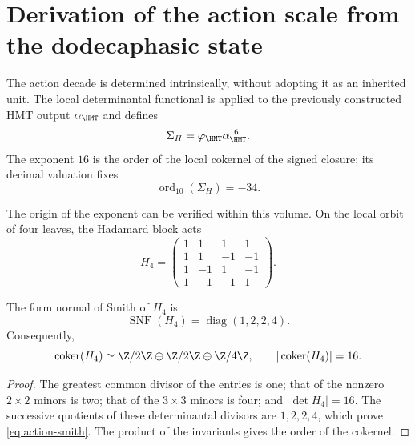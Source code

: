 \label{ch:vacuum}

\section{Derivation of the action scale from the dodecaphasic state}

The action decade is determined intrinsically, without adopting it as an
inherited unit. The local determinantal functional is applied to the previously
constructed HMT output \(\alpha_{\HMT}\) and defines
\begin{equation}
\Sigma_H=\varphi_{\HMT}\alpha_{\HMT}^{16}.
\label{eq:action-determinantal-reader}
\end{equation}
The exponent \(16\) is the order of the local cokernel of the signed closure; its decimal valuation fixes
\begin{equation}
\operatorname{ord}_{10}(\Sigma_H)=-34.
\label{eq:action-decade}
\end{equation}

The origin of the exponent can be verified within this volume. On the
local orbit of four leaves, the Hadamard block acts
\begin{equation}
H_4=
\begin{pmatrix}
1&1&1&1\\
1&1&-1&-1\\
1&-1&1&-1\\
1&-1&-1&1
\end{pmatrix}.
\label{eq:action-hadamard}
\end{equation}

\begin{lemma}
The form normal of Smith of \(H_4\) is
\begin{equation}
\operatorname{SNF}(H_4)=\operatorname{diag}(1,2,2,4).
\label{eq:action-smith}
\end{equation}
Consequently,
\[
\operatorname{coker}(H_4)\simeq
\Z/2\Z\oplus\Z/2\Z\oplus\Z/4\Z,
\qquad
|\operatorname{coker}(H_4)|=16.
\]
\end{lemma}

\begin{proof}
The greatest common divisor of the entries is one; that of the nonzero
\(2\times2\) minors is two; that of the \(3\times3\) minors is four; and
\(|\det H_4|=16\). The successive quotients of these determinantal divisors
are \(1,2,2,4\), which prove \cref{eq:action-smith}. The product of the
invariants gives the order of the cokernel.
\end{proof}

